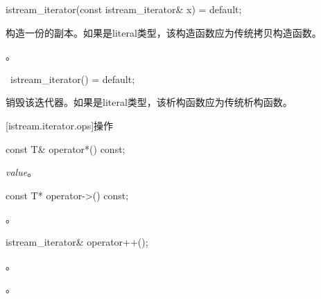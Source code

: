 %
\begin{itemdecl}
istream_iterator(const istream_iterator& x) = default;
\end{itemdecl}

\begin{itemdescr}
\pnum
\effects
构造一份的副本。如果是literal类型，该构造函数应为传统拷贝构造函数。

\pnum
\postcondition {}。
\end{itemdescr}

%
\begin{itemdecl}
~istream_iterator() = default;
\end{itemdecl}

\begin{itemdescr}
\pnum
\effects
销毁该迭代器。如果是literal类型，该析构函数应为传统析构函数。
\end{itemdescr}

[istream.iterator.ops]{操作}

%
%
\begin{itemdecl}
const T& operator*() const;
\end{itemdecl}

\begin{itemdescr}
\pnum
\returns
\textit{value}。
\end{itemdescr}

%
%
\begin{itemdecl}
const T* operator->() const;
\end{itemdecl}

\begin{itemdescr}
\pnum
\returns
{}。
\end{itemdescr}

%
%
\begin{itemdecl}
istream_iterator& operator++();
\end{itemdecl}

\begin{itemdescr}
\pnum
\requires {}。

\pnum
\effects
{}

\pnum
\returns
{}。
\end{itemdescr}

